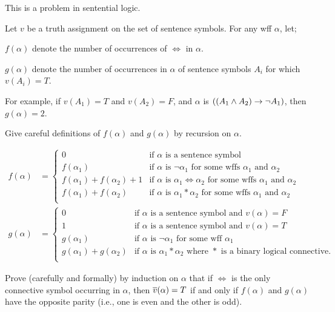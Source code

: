 \begin{problem}
  This is a problem in sentential logic.

  \step
  Let $v$ be a truth assignment on the set of sentence symbols.
  For any wff $\alpha$, let;
  \begin{enumroman}
    \item $f(\alpha)$ denote the number of occurrences of
      $\iff$ in $\alpha$.
    \item $g(\alpha)$ denote the number of occurrences in $\alpha$
      of sentence symbols $A_i$ for which $v(A_i) = T$.
  \end{enumroman}
  For example, if $v(A_1) = T$ and $v(A_2) = F$,
  and $\alpha$ is $((A_1 \land A_2) \rightarrow \lnot A_1)$,
  then $g(\alpha) = 2$.
  \begin{enumalph}
    \item Give careful definitions of $f(\alpha)$ and $g(\alpha)$
      by recursion on $\alpha$.
      \begin{Answer}
        \begin{align*}
          f(\alpha) &=
            \begin{cases}
              0 & \text{if $\alpha$ is a sentence symbol} \\
              f(\alpha_1) & \text{if $\alpha$ is $\lnot \alpha_1$ for some wffs $\alpha_1$ and $\alpha_2$} \\
              f(\alpha_1) + f(\alpha_2) + 1 & \text{if $\alpha$ is $\alpha_1 \iff \alpha_2$ for some wffs $\alpha_1$ and $\alpha_2$} \\
              f(\alpha_1) + f(\alpha_2) & \text{if $\alpha$ is $\alpha_1 \ast \alpha_2$ for some wffs $\alpha_1$ and $\alpha_2$} \\
            \end{cases} \\
          g(\alpha) &=
            \begin{cases}
              0 & \text{if $\alpha$ is a sentence symbol and $v(\alpha) = F$} \\
              1 & \text{if $\alpha$ is a sentence symbol and $v(\alpha) = T$} \\
              g(\alpha_1) & \text{if $\alpha$ is $\lnot \alpha_1$ for some wff $\alpha_1$} \\
              g(\alpha_1) + g(\alpha_2) &
                \text{if $\alpha$ is $\alpha_1 \ast \alpha_2$ where $\ast$ is a binary logical connective.}\\
            \end{cases}
        \end{align*}
      \end{Answer}
    \newpage
    \item Prove (carefully and formally) by induction on $\alpha$
      that if $\iff$ is the only connective symbol occurring in $\alpha$,
      then $\overline{v}(\alpha) = T$ if and only if $f(\alpha)$ and $g(\alpha)$
      have the opposite parity (i.e., one is even and the other is odd).
      \begin{Answer}
      \end{Answer}
  \end{enumalph}
\end{problem}
